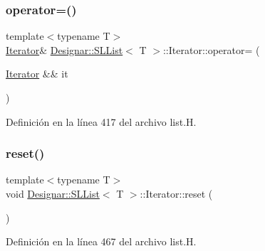 \mbox{\label{class_designar_1_1_s_l_list_1_1_iterator_a9215becbdd87b11db7f6481e96df9343}} 
\subsubsection{\texorpdfstring{operator=()}{operator=()}\hspace{0.1cm}{\footnotesize\ttfamily [2/2]}}
{\footnotesize\ttfamily template$<$typename T$>$ \\
\hyperlink{class_designar_1_1_s_l_list_1_1_iterator}{Iterator}\& \hyperlink{class_designar_1_1_s_l_list}{Designar\+::\+S\+L\+List}$<$ T $>$\+::Iterator\+::operator= (\begin{DoxyParamCaption}\item[{\hyperlink{class_designar_1_1_s_l_list_1_1_iterator}{Iterator} \&\&}]{it }\end{DoxyParamCaption})\hspace{0.3cm}{\ttfamily [inline]}}



Definición en la línea 417 del archivo list.\+H.

\mbox{\label{class_designar_1_1_s_l_list_1_1_iterator_adb490da387d9628b7b61217247e96d97}} 
\subsubsection{\texorpdfstring{reset()}{reset()}}
{\footnotesize\ttfamily template$<$typename T$>$ \\
void \hyperlink{class_designar_1_1_s_l_list}{Designar\+::\+S\+L\+List}$<$ T $>$\+::Iterator\+::reset (\begin{DoxyParamCaption}{ }\end{DoxyParamCaption})\hspace{0.3cm}{\ttfamily [inline]}}



Definición en la línea 467 del archivo list.\+H.

